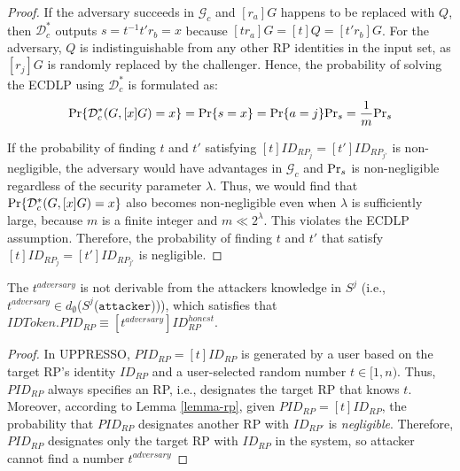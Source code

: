 \begin{proof}
    If the adversary succeeds in $\mathcal{G}_c$ and $[r_a]G$ happens to be replaced with $Q$, then $\mathcal{D}^*_c$ outputs $s=t^{-1}t'r_b =x$ because $[tr_a]G = [t]Q = [t'r_b]G$. For the adversary, $Q$ is indistinguishable from any other RP identities in the input set, as $[r_j]G$ is randomly replaced by the challenger.
    Hence, the probability of solving the ECDLP using $\mathcal{D}^*_c$ is formulated as:
    \begin{equation*}
      {\rm Pr}\{\mathcal{D}^*_c(G, [x]G)=x\} = {\rm Pr}\{s = x\}={\rm Pr}\{a=j\}{\rm Pr}_s=\frac{1}{m}{\rm Pr}_s
    \end{equation*}
  
    If the probability of finding $t$ and $t'$ satisfying $[t]ID_{RP_j} = [t']ID_{RP_{j'}}$ is non-negligible, the adversary would have advantages  in $\mathcal{G}_c$ and ${\rm Pr}_s$ is non-negligible regardless of the security parameter $\lambda$.
    Thus, we would find that ${\rm Pr}\{\mathcal{D}^*_c(G, [x]G)=x\}$ also becomes non-negligible even when $\lambda$ is sufficiently large, because $m$ is a finite integer and $m \ll 2^\lambda$.
    \color{black}
    This violates the ECDLP assumption. Therefore, the probability of finding $t$ and $t'$ that satisfy $[t]ID_{RP_j} = [t']ID_{RP_{j'}}$ is negligible. \hfill
  \end{proof}
  
  \begin{lemma}
    The $t^{adversary}$ is not derivable from the attackers knowledge in $S^j$ (i.e., $t^{adversary} \in d_{\emptyset}$($S^j$($\mathtt{attacker}$))), which satisfies that $IDToken.PID_{RP} \equiv [t^{adversary}]ID_{RP}^{honest}$.
  \end{lemma}
  \begin{proof}
    In UPPRESSO, $PID_{RP}=[t]ID_{RP}$ is generated by a user based on the target RP's identity $ID_{RP}$ and a user-selected random number $t \in [1,n)$.
    Thus, $PID_{RP}$ always specifies an RP, i.e., %
    designates the target RP that knows $t$. 
    Moreover, according to Lemma \ref{lemma-rp}, given $PID_{RP} = [t]ID_{RP}$, the probability that $PID_{RP}$ designates another RP with $ID_{RP'}$ is \emph{negligible}. %
    Therefore, $PID_{RP}$ designates only the target RP with $ID_{RP}$ in the system, 
    so attacker cannot find a number $t^{adversary}$\hfill
  \end{proof}
  

